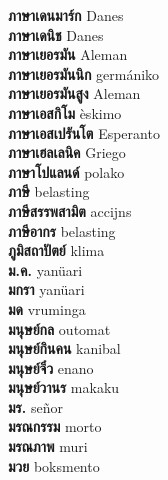\textbf{ ภาษาเดนมาร์ก  } Danes \\
\textbf{ ภาษาเดนิช  } Danes \\
\textbf{ ภาษาเยอรมัน  } Aleman \\
\textbf{ ภาษาเยอรมันนิก  } germániko \\
\textbf{ ภาษาเยอรมันสูง  } Aleman \\
\textbf{ ภาษาเอสกิโม  } èskimo \\
\textbf{ ภาษาเอสเปรันโต  } Esperanto \\
\textbf{ ภาษาเฮลเลนิค  } Griego \\
\textbf{ ภาษาโปแลนด์  } polako \\
\textbf{ ภาษี  } belasting \\
\textbf{ ภาษีสรรพสามิต  } accijns \\
\textbf{ ภาษีอากร  } belasting \\
\textbf{ ภูมิสถาปัตย์  } klima \\
\textbf{ ม.ค.  } yanüari \\
\textbf{ มกรา  } yanüari \\
\textbf{ มด  } vruminga \\
\textbf{ มนุษย์กล  } outomat \\
\textbf{ มนุษย์กินคน  } kanibal \\
\textbf{ มนุษย์จิ๋ว  } enano \\
\textbf{ มนุษย์วานร  } makaku \\
\textbf{ มร.  } señor \\
\textbf{ มรณกรรม  } morto \\
\textbf{ มรณภาพ  } muri \\
\textbf{ มวย  } boksmento \\
